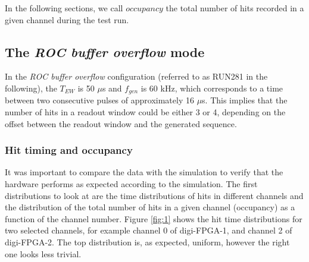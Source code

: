     In the following sections, we call $occupancy$ the total number of hits
recorded in a given channel during the test run. 
\subsection{The \textit{ROC buffer overflow} mode}
In the \textit{ROC buffer overflow} configuration (referred to as RUN281 in the following), 
the $T_{EW}$ is 50 $\mu$s and $f_{gen}$ is 60 kHz, which corresponds to 
a time between two consecutive pulses of approximately 16 $\mu$s.
This implies that the number of hits in a readout window could be 
either 3 or 4, depending on the offset between the readout window and the generated sequence.
\subsubsection{Hit timing and occupancy}\label{over}
It was important to compare the data with the simulation to verify that the 
hardware performs as expected according to the simulation. 
The first distributions to look at are the time distributions of hits in 
different channels and the distribution of the total number of hits
in a given channel (occupancy) as a function of the channel number.
Figure \ref{fig:1} shows the hit time distributions for two selected 
channels, for example channel 0 of digi-FPGA-1, and channel 2 of digi-FPGA-2.
The top distribution is, as expected, uniform, however the right one looks less trivial.
